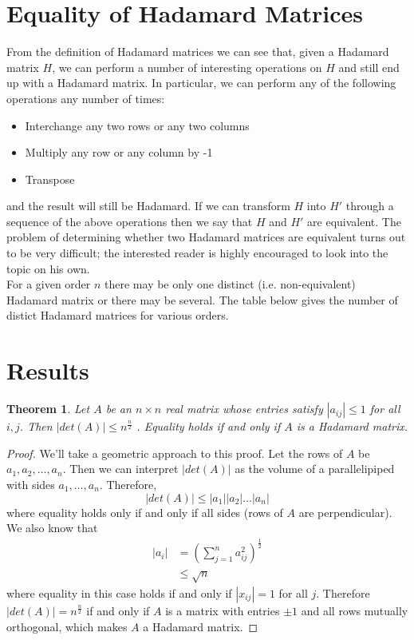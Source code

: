 \documentclass{article}
\newtheorem{theorem}{Theorem}[section]
\theoremstyle{definition}
\begin{document}
\section{Equality of Hadamard Matrices}
From the definition of Hadamard matrices we can see that, given a Hadamard matrix $H$, we can perform a number of interesting operations on $H$ and still end up with a Hadamard matrix. In particular, we can perform any of the following operations any number of times:
\begin{itemize}
  \item Interchange any two rows or any two columns
  \item Multiply any row or any column by -1
  \item Transpose
\end{itemize}
and the result will still be Hadamard. If we can transform $H$ into $H'$ through a sequence of the above operations then we say that $H$ and $H'$ are equivalent. The problem of determining whether two Hadamard matrices are equivalent turns out to be very difficult; the interested reader is highly encouraged to look into the topic on his own.\\

For a given order $n$ there may be only one distinct (i.e. non-equivalent) Hadamard matrix or there may be several. The table below gives the number of distict Hadamard matrices for various orders.

\section{Results}

\begin{theorem}
Let $A$  be an $n \times n$ real matrix whose entries satisfy $| a_{ij} | \leq 1$ for all $i , j$.  Then $| det ( A) | \leq n^{\frac n  2}$ .  Equality holds if and only if $A$ is a Hadamard matrix.
\end{theorem}

\begin{proof}
 We'll take a geometric approach to this proof. Let the rows of $A$ be $a_1, a_2, \ldots, a_n$. Then we can interpret $|det(A)|$ as the volume of a parallelipiped with sides $a_1, \ldots, a_n$. Therefore,
 $$ |det(A)| \leq |a_1||a_2| \ldots |a_n|$$
 where equality holds only if and only if all sides (rows of $A$ are perpendicular). We also know that
 \begin{align*}
 |a_i| &= \left( \sum_{j = 1}^n a_{ij}^2 \right)^{\frac 1 2} \\
 & \leq \sqrt n
 \end{align*}
 where equality in this case holds if and only if $|x_{ij}| = 1$ for all $j$. Therefore  $| det ( A) | = n^{\frac n  2}$ if and only if $A$ is a matrix with entries $\pm 1$ and all rows mutually orthogonal, which makes $A$ a Hadamard matrix.
\end{proof}
\end{document}
